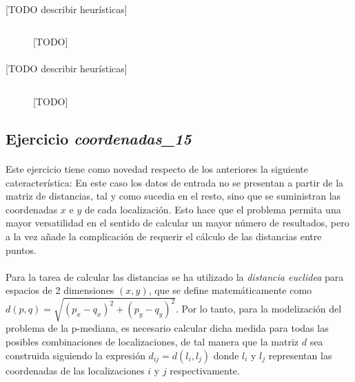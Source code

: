 \documentclass[spanish]{article}
\begin{document}
		\paragraph{}
		[TODO describir heurísticas]

		\begin{figure}[H]
			\centering
			\inputminted{basic}{./code/p-median-greedy.mos}
			\caption{[TODO]}
			\label{}
		\end{figure}

		\paragraph{}
		[TODO describir heurísticas]

		\begin{figure}[H]
			\centering
			\inputminted{basic}{./code/local-search-p-median-greedy.mos}
			\caption{[TODO]}
			\label{}
		\end{figure}

		\subsection{Ejercicio \emph{coordenadas\_15}}
		\label{sec:e-8a}

			\paragraph{}
			Este ejercicio tiene como novedad respecto de los anteriores la siguiente cateracterística: En este caso los datos de entrada no se presentan a partir de la matriz de distancias, tal y como sucedia en el resto, sino que se suministran las coordenadas $x$ e $y$ de cada localización. Esto hace que el problema permita una mayor versatilidad en el sentido de calcular un mayor número de resultados, pero a la vez añade la complicación de requerir el cálculo de las distancias entre puntos.

			\paragraph{}
			Para la tarea de calcular las distancias se ha utilizado la \emph{distancia euclidea} para espacios de 2 dimensiones $(x,y)$, que se define matemáticamente como $d(p, q) = \sqrt{(p_x - q_x)^2 + (p_y - q_y)^2}$. Por lo tanto, para la modelización del problema de la p-mediana, es necesario calcular dicha medida para todas las posibles combinaciones de localizaciones, de tal manera que la matriz $d$ sea construida siguiendo la expresión $d_{ij} = d(l_i, l_j)$ donde $l_i$ y $l_j$ representan las coordenadas de las localizaciones $i$ y $j$ respectivamente.
\end{document}
